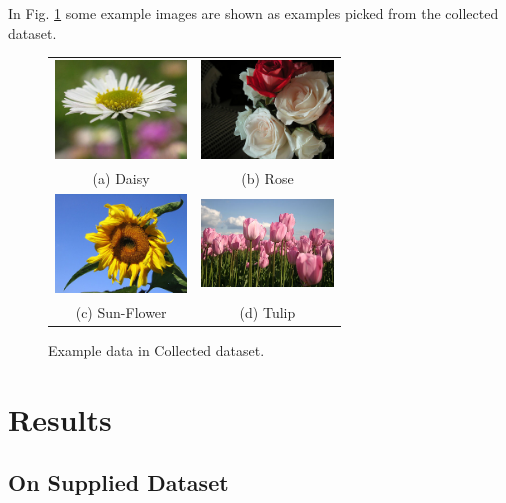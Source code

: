 \documentclass[10pt,journal,compsoc]{IEEEtran}
\begin{document}
In Fig. \ref{fig:flowers-examples} some example images are shown as examples picked from the collected dataset.

\begin{figure}
    \centering
    \begin{tabular}{cc}
    \includegraphics[width=35mm]{images/example-daisy.jpg} &
    \includegraphics[width=35mm]{images/example-rose.jpg} \\
    (a) Daisy & (b) Rose \\[6pt]
    \hspace{0mm}
    \includegraphics[width=35mm]{images/example-sun-flower.jpg} & \includegraphics[width=35mm]{images/example-tulip.jpg} \\
    (c) Sun-Flower & (d) Tulip \\[6pt]
    \end{tabular}
    \caption{Example data in Collected dataset.}
    \label{fig:flowers-examples}
\end{figure}

\section{Results}

\subsection{On Supplied Dataset}
\end{document}
